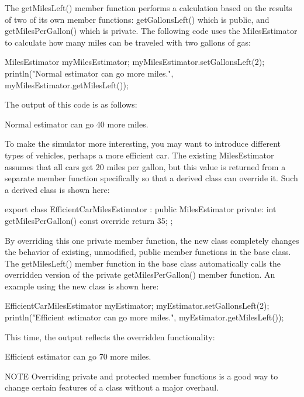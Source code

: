 The getMilesLeft() member function performs a calculation based on the results of two of its own member functions: getGallonsLeft() which is public, and getMilesPerGallon() which is private. The following code uses the MilesEstimator to calculate how many miles can be traveled with two gallons of gas:

\begin{cpp}
MilesEstimator myMilesEstimator;
myMilesEstimator.setGallonsLeft(2);
println("Normal estimator can go {} more miles.",
    myMilesEstimator.getMilesLeft());
\end{cpp}

The output of this code is as follows:

\begin{shell}
Normal estimator can go 40 more miles.
\end{shell}

To make the simulator more interesting, you may want to introduce different types of vehicles, perhaps a more efficient car. The existing MilesEstimator assumes that all cars get 20 miles per gallon, but this value is returned from a separate member function specifically so that a derived class can override it. Such a derived class is shown here:

\begin{cpp}
export class EfficientCarMilesEstimator : public MilesEstimator
{
    private:
        int getMilesPerGallon() const override { return 35; }
};
\end{cpp}

By overriding this one private member function, the new class completely changes the behavior of existing, unmodified, public member functions in the base class. The getMilesLeft() member function in the base class automatically calls the overridden version of the private getMilesPerGallon() member function. An example using the new class is shown here:

\begin{cpp}
EfficientCarMilesEstimator myEstimator;
myEstimator.setGallonsLeft(2);
println("Efficient estimator can go {} more miles.",
        myEstimator.getMilesLeft());
\end{cpp}

This time, the output reflects the overridden functionality:

\begin{shell}
Efficient estimator can go 70 more miles.
\end{shell}

\begin{myNotic}{NOTE}
Overriding private and protected member functions is a good way to change certain features of a class without a major overhaul.
\end{myNotic}


